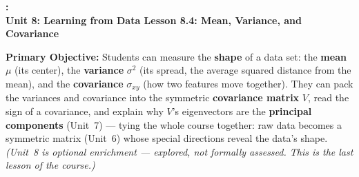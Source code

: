 \documentclass[10pt]{article}
\newcommand{\UnitNumberName}{Unit 8: Learning from Data \quad}
\newcommand{\LessonNumberName}{Lesson 8.4: Mean, Variance, and Covariance}
\begin{document}
\begin{center}
    {\Large\bfseries \CourseName: \SchoolYear \\
    {\small\bfseries \UnitNumberName \LessonNumberName}}
\end{center}

\begin{tcolorbox}[colback=blush, colframe=burgundy, boxrule=0.9pt, arc=2mm,
    left=2mm, right=2mm, top=1.5mm, bottom=1.5mm]
    \textbf{Primary Objective:} Students can measure the \textbf{shape} of a data set: the \textbf{mean} $\mu$
    (its center), the \textbf{variance} $\sigma^2$ (its spread, the average squared distance from the mean), and
    the \textbf{covariance} $\sigma_{xy}$ (how two features move together). They can pack the variances and
    covariance into the symmetric \textbf{covariance matrix} $V$, read the sign of a covariance, and explain why
    $V$'s eigenvectors are the \textbf{principal components} (Unit~7) --- tying the whole course together: raw
    data becomes a symmetric matrix (Unit~6) whose special directions reveal the data's shape. \emph{(Unit~8 is
    optional enrichment --- explored, not formally assessed. This is the last lesson of the course.)}
\end{tcolorbox}
\end{document}
